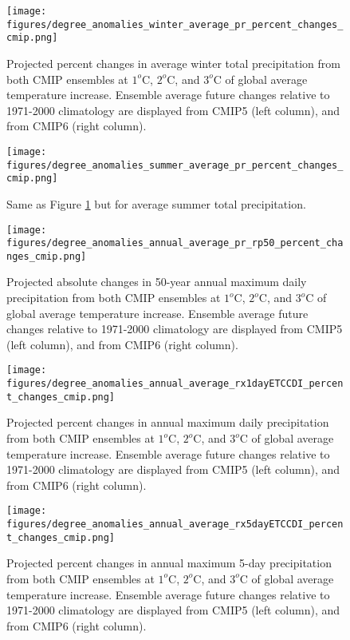 \documentclass[]{scrartcl}
\begin{document}
\begin{appendices}
\begin{figure}[ht!]
	\centering
	\texttt{[image: figures/degree\_anomalies\_winter\_average\_pr\_percent\_changes\_cmip.png]}
	\caption[Pr]{Projected percent changes in average winter total precipitation from both CMIP ensembles at $1^o$C, $2^o$C, and $3^o$C of global average temperature increase. Ensemble average future changes relative to 1971-2000 climatology are displayed from CMIP5 (left column), and from CMIP6 (right column).}
	\label{fig:win_pr_deg_anoms}
\end{figure}

\begin{figure}[ht!]
	\centering
	\texttt{[image: figures/degree\_anomalies\_summer\_average\_pr\_percent\_changes\_cmip.png]}
	\caption[Pr]{Same as Figure \ref{fig:win_pr_deg_anoms} but for average summer total precipitation.}
	\label{fig:summer_pr_deg_anoms}
\end{figure}

\begin{figure}[ht!]
	\centering
	\texttt{[image: figures/degree\_anomalies\_annual\_average\_pr\_rp50\_percent\_changes\_cmip.png]}
	\caption[Tas]{Projected absolute changes in 50-year annual maximum daily precipitation from both CMIP ensembles at $1^o$C, $2^o$C, and $3^o$C of global average temperature increase. Ensemble average future changes relative to 1971-2000 climatology are displayed from CMIP5 (left column), and from CMIP6 (right column).}
	\label{fig:ext_pr50_deg_anoms}
\end{figure}


\begin{figure}[ht!]
	\centering
	\texttt{[image: figures/degree\_anomalies\_annual\_average\_rx1dayETCCDI\_percent\_changes\_cmip.png]}
	\caption[Pr]{Projected percent changes in annual maximum daily precipitation from both CMIP ensembles at $1^o$C, $2^o$C, and $3^o$C of global average temperature increase. Ensemble average future changes relative to 1971-2000 climatology are displayed from CMIP5 (left column), and from CMIP6 (right column).}
	\label{fig:rx1day_deg_anoms}
\end{figure}

\begin{figure}[ht!]
	\centering
	\texttt{[image: figures/degree\_anomalies\_annual\_average\_rx5dayETCCDI\_percent\_changes\_cmip.png]}
	\caption[Pr]{Projected percent changes in annual maximum 5-day precipitation from both CMIP ensembles at $1^o$C, $2^o$C, and $3^o$C of global average temperature increase. Ensemble average future changes relative to 1971-2000 climatology are displayed from CMIP5 (left column), and from CMIP6 (right column).}
	\label{fig:rx5day_deg_anoms}
\end{figure}



\end{appendices}
\end{document}

